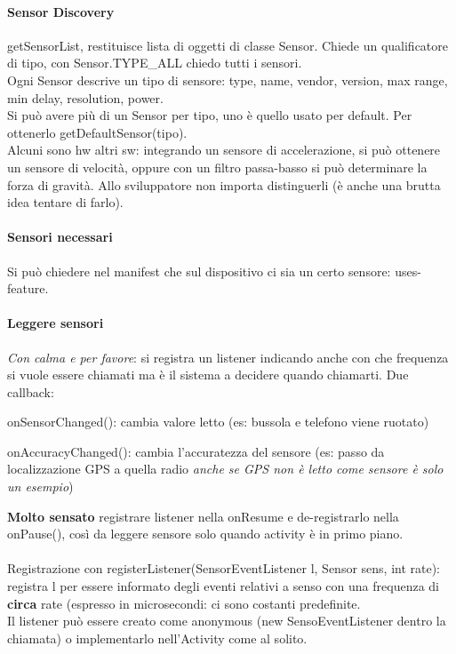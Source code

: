 \documentclass[10pt]{book}
\begin{document}
\paragraph{Sensor Discovery} getSensorList, restituisce lista di oggetti di classe Sensor. Chiede un qualificatore di tipo, con Sensor.TYPE\_ALL chiedo tutti i sensori.\\
Ogni Sensor descrive un tipo di sensore: type, name, vendor, version, max range, min delay, resolution, power.\\
Si può avere più di un Sensor per tipo, uno è quello usato per default. Per ottenerlo getDefaultSensor(tipo).\\
Alcuni sono hw altri sw: integrando un sensore di accelerazione, si può ottenere un sensore di velocità, oppure con un filtro passa-basso si può determinare la forza di gravità. Allo sviluppatore non importa distinguerli (è anche una brutta idea tentare di farlo).
\paragraph{Sensori necessari} Si può chiedere nel manifest che sul dispositivo ci sia un certo sensore: uses-feature.
\paragraph{Leggere sensori} \textit{Con calma e per favore}: si registra un listener indicando anche con che frequenza si vuole essere chiamati ma è il sistema a decidere quando chiamarti. Due callback:
\begin{list}{}{}
	\item onSensorChanged(): cambia valore letto (es: bussola e telefono viene ruotato)
	\item onAccuracyChanged(): cambia l'accuratezza del sensore (es: passo da localizzazione GPS a quella radio \textit{anche se GPS non è letto come sensore è solo un esempio})
\end{list}
\textbf{Molto sensato} registrare listener nella onResume e de-registrarlo nella onPause(), così da leggere sensore solo quando activity è in primo piano.\\\\
Registrazione con registerListener(SensorEventListener l, Sensor sens, int rate): registra l per essere informato degli eventi relativi a senso con una frequenza di \textbf{circa} rate (espresso in microsecondi: ci sono costanti predefinite.\\
Il listener può essere creato come anonymous (new SensoEventListener dentro la chiamata) o implementarlo nell'Activity come al solito.
\end{document}
